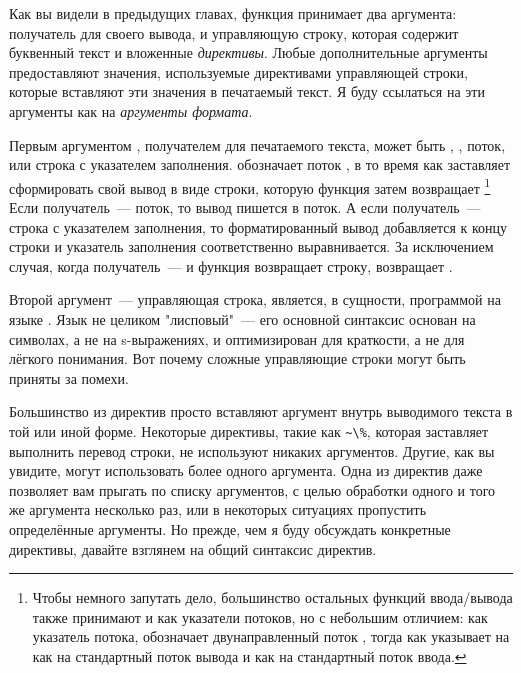 {Как вы видели в предыдущих главах, функция  принимает два аргумента:
получатель для своего вывода, и управляющую строку, которая содержит буквенный текст и
вложенные \textit{директивы}. Любые дополнительные аргументы предоставляют значения,
используемые директивами управляющей строки, которые вставляют эти значения в печатаемый
текст. Я буду ссылаться на эти аргументы как на \textit{аргументы формата}.

Первым аргументом , получателем для печатаемого текста, может быть ,
, поток, или строка с указателем заполнения.  обозначает поток
, в то время как  заставляет  сформировать
свой вывод в виде строки, которую функция затем возвращает \footnote{Чтобы немного
  запутать дело, большинство остальных функций ввода/вывода также принимают  и
   как указатели потоков, но с небольшим отличием: как указатель потока,
   обозначает двунаправленный поток , тогда как 
  указывает на  как на стандартный поток вывода и
   как на стандартный поток ввода.} Если получатель~--- поток, то
вывод пишется в поток. А если получатель~--- строка с указателем заполнения, то
форматированный вывод добавляется к концу строки и указатель заполнения соответственно
выравнивается. За исключением случая, когда получатель~---  и функция возвращает
строку,  возвращает .

Второй аргумент~--- управляющая строка, является, в сущности, программой на языке
. Язык  не целиком "лисповый"~--- его основной синтаксис основан
на символах, а не на s-выражениях, и оптимизирован для краткости, а не для лёгкого
понимания. Вот почему сложные управляющие строки  могут быть приняты за
помехи.

Большинство из директив  просто вставляют аргумент внутрь выводимого текста в
той или иной форме. Некоторые директивы, такие как \lstinline!~\%!, которая заставляет
 выполнить перевод строки, не используют никаких аргументов. Другие, как вы
увидите, могут использовать более одного аргумента. Одна из директив даже позволяет вам
прыгать по списку аргументов, с целью обработки одного и того же аргумента несколько раз,
или в некоторых ситуациях пропустить определённые аргументы. Но прежде, чем я буду
обсуждать конкретные директивы, давайте взглянем на общий синтаксис директив.

}

